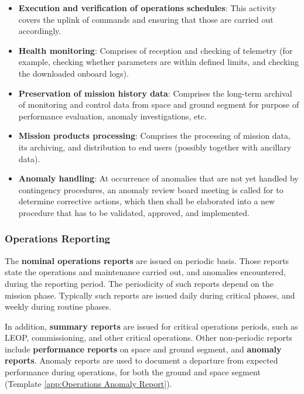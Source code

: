 \begin{itemize}
\item \textbf{Execution and verification of operations schedules}: This activity covers the uplink of commands and ensuring that those are carried out accordingly.

\item \textbf{Health monitoring}: Comprises of reception and checking of telemetry (for example, checking whether parameters are within defined limits, and checking the downloaded onboard logs).  

\item \textbf{Preservation of mission history data}: Comprises the long-term archival of monitoring and control data from space and ground segment for purpose of performance evaluation, anomaly investigations, etc.

\item \textbf{Mission products processing}: Comprises the processing of mission data, its archiving, and distribution to end users (possibly together with ancillary data).

\item \textbf{Anomaly handling}: At occurrence of anomalies that are not yet handled by contingency procedures, an anomaly review board meeting is called for to determine corrective actions, which then shall be elaborated into a new procedure that has to be validated, approved, and implemented.

\end{itemize}

\subsubsection{Operations Reporting} 
\label{sec:Operations Reporting}

The \textbf{nominal operations reports} are issued on periodic basis. Those reports state the operations and maintenance carried out, and anomalies encountered, during the reporting period. The periodicity of such reports depend on the mission phase. Typically such reports are issued daily during critical phases, and weekly during routine phases.

In addition, \textbf{summary reports} are issued for critical operations periods, such as LEOP, commissioning, and other critical operations. Other non-periodic reports include \textbf{performance reports} on space and ground segment, and \textbf{anomaly reports}. Anomaly reports are used to document a departure from expected performance during operations, for both the ground and space segment (Template \ref{app:Operations Anomaly Report}).

